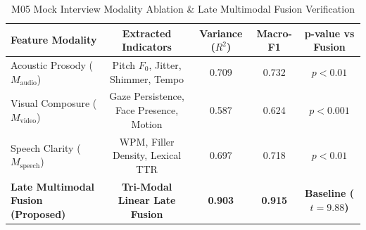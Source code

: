 \begin{table}[htbp]
\centering
\caption{M05 Mock Interview Modality Ablation & Late Multimodal Fusion Verification}
\label{tab:modality_ablation}
\begin{tabular}{lcccc}
\hline
\textbf{Feature Modality} & \textbf{Extracted Indicators} & \textbf{Variance ($R^2$)} & \textbf{Macro-F1} & \textbf{p-value vs Fusion} \\
\hline
Acoustic Prosody ($M_{\text{audio}}$) & Pitch $F_0$, Jitter, Shimmer, Tempo & 0.709 & 0.732 & $p < 0.01$ \\
Visual Composure ($M_{\text{video}}$) & Gaze Persistence, Face Presence, Motion & 0.587 & 0.624 & $p < 0.001$ \\
Speech Clarity ($M_{\text{speech}}$) & WPM, Filler Density, Lexical TTR & 0.697 & 0.718 & $p < 0.01$ \\
\hline
\textbf{Late Multimodal Fusion (Proposed)} & \textbf{Tri-Modal Linear Late Fusion} & \textbf{0.903} & \textbf{0.915} & \textbf{Baseline ($t=9.88$)} \\
\hline
\end{tabular}
\end{table}
